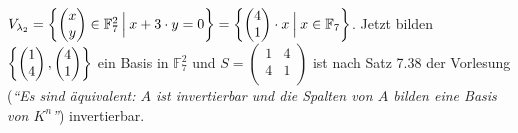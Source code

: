 \documentclass{scrreprt}
\begin{document}
\begin{enumerate}[(i)]
  $V_{\lambda_2} = \qty{
    \begin{pmatrix}x\\y\end{pmatrix} \in \mathbb{F}_7^2
    \:{\Big |}\:
    x + 3 \cdot y = 0
  } = \qty{
    \begin{pmatrix}4\\1\end{pmatrix} \cdot x
    \:{\Big |}\:
    x \in \mathbb{F}_7
  }$.
   Jetzt bilden $\qty{
    \begin{pmatrix}1\\4\end{pmatrix},
    \begin{pmatrix}4\\1\end{pmatrix}
  }$ ein Basis in $\mathbb{F}_7^2$ und
  $S = \begin{pmatrix}
    1 & 4 \\
    4 & 1 \\
  \end{pmatrix}$ ist nach Satz 7.38 der Vorlesung (\emph{``Es sind äquivalent:
    $A$ ist invertierbar und die Spalten von $A$ bilden eine Basis von $K^n$''})
  invertierbar.


\end{enumerate}
\end{document}
